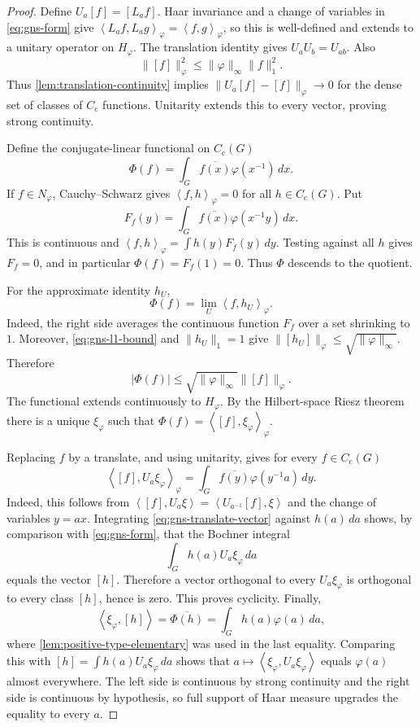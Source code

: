 \documentclass[11pt]{article}
\theoremstyle{definition}
\theoremstyle{remark}
\newcommand{\Cc}{C_{\mathrm c}}
\newcommand{\abs}[1]{\lvert #1\rvert}
\newcommand{\norm}[1]{\lVert #1\rVert}
\newcommand{\angles}[1]{\left\langle #1\right\rangle}
\begin{document}
\begin{proof}
Define $U_a[f]=[L_af]$.  Haar invariance and a change of variables in
\eqref{eq:gns-form} give
$\angles{L_af,L_ag}_\varphi=\angles{f,g}_\varphi$, so this is well-defined and extends
to a unitary operator on $H_\varphi$.  The translation identity gives
$U_aU_b=U_{ab}$.  Also
\begin{equation}
  \norm{[f]}_\varphi^2
  \leq\norm\varphi_\infty\norm f_1^2.
  \label{eq:gns-l1-bound}
\end{equation}
Thus \cref{lem:translation-continuity} implies
$\norm{U_a[f]-[f]}_\varphi\to0$ for the dense set of classes of $\Cc$ functions.
Unitarity extends this to every vector, proving strong continuity.

Define the conjugate-linear functional on $\Cc(G)$
\[
  \Phi(f)=\int_G\overline{f(x)}\varphi(x^{-1})\,dx.
\]
If $f\in N_\varphi$, Cauchy--Schwarz gives
$\angles{f,h}_\varphi=0$ for all $h\in\Cc(G)$.  Put
\[
 F_f(y)=\int_G\overline{f(x)}\varphi(x^{-1}y)\,dx.
\]
This is continuous and $\angles{f,h}_\varphi=\int h(y)F_f(y)\,dy$.  Testing against all
$h$ gives $F_f=0$, and in particular $\Phi(f)=F_f(1)=0$.  Thus $\Phi$ descends to the
quotient.

For the approximate identity $h_U$,
\[
 \Phi(f)=\lim_U\angles{f,h_U}_\varphi.
\]
Indeed, the right side averages the continuous function $F_f$ over a set shrinking to
$1$.  Moreover, \eqref{eq:gns-l1-bound} and $\norm{h_U}_1=1$ give
$\norm{[h_U]}_\varphi\leq\sqrt{\norm\varphi_\infty}$.  Therefore
\[
 \abs{\Phi(f)}\leq\sqrt{\norm\varphi_\infty}\norm{[f]}_\varphi.
\]
The functional extends continuously to $H_\varphi$.  By the Hilbert-space Riesz theorem
there is a unique $\xi_\varphi$ such that
$\Phi(f)=\angles{[f],\xi_\varphi}_\varphi$.

Replacing $f$ by a translate, and using unitarity, gives for every $f\in\Cc(G)$
\begin{equation}
 \angles{[f],U_a\xi_\varphi}_\varphi
 =\int_G\overline{f(y)}\varphi(y^{-1}a)\,dy.
 \label{eq:gns-translate-vector}
\end{equation}
Indeed, this follows from
$\angles{[f],U_a\xi}=\angles{U_{a^{-1}}[f],\xi}$ and the change of variables $y=ax$.
Integrating \eqref{eq:gns-translate-vector} against $h(a)\,da$ shows, by comparison with
\eqref{eq:gns-form}, that the Bochner integral
\[
  \int_G h(a)U_a\xi_\varphi\,da
\]
equals the vector $[h]$.  Therefore a vector orthogonal to every $U_a\xi_\varphi$ is
orthogonal to every class $[h]$, hence is zero.  This proves cyclicity.  Finally,
\[
 \angles{\xi_\varphi,[h]}
 =\overline{\Phi(h)}
 =\int_Gh(a)\varphi(a)\,da,
\]
where \cref{lem:positive-type-elementary} was used in the last equality.  Comparing this
with $[h]=\int h(a)U_a\xi_\varphi\,da$ shows that
$a\mapsto\angles{\xi_\varphi,U_a\xi_\varphi}$ equals $\varphi(a)$ almost everywhere.
The left side is continuous by strong continuity and the right side is continuous by
hypothesis, so full support of Haar measure upgrades the equality to every $a$.
\end{proof}
\end{document}
